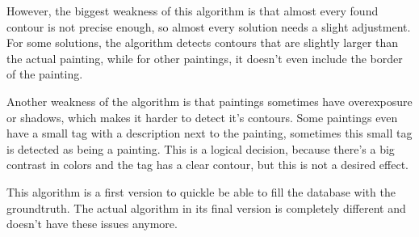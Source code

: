 However, the biggest weakness of this algorithm is that almost every found contour is not precise enough, so almost every solution needs a slight adjustment. For some solutions, the algorithm detects contours that are slightly larger than the actual painting, while for other paintings, it doesn't even include the border of the painting.

Another weakness of the algorithm is that paintings sometimes have overexposure or shadows, which makes it harder to detect it's contours. Some paintings even have a small tag with a description next to the painting, sometimes this small tag is detected as being a painting. This is a logical decision, because there's a big contrast in colors and the tag has a clear contour, but this is not a desired effect.

This algorithm is a first version to quickle be able to fill the database with the groundtruth. The actual algorithm in its final version is completely different and doesn't have these issues anymore.
